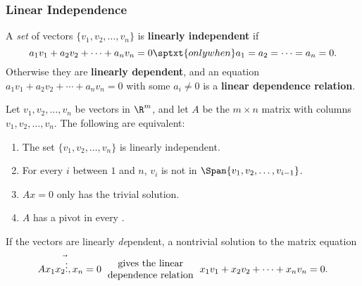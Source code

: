 
\begin{frame}
\frametitle{Linear Independence}

A \emph{set} of vectors $\{v_1,v_2,\ldots,v_n\}$ is
\textbf{linearly independent} if
\[ a_1v_1 + a_2v_2 + \cdots + a_nv_n = 0 
\sptxt{only when} a_1 = a_2 = \cdots = a_n = 0. \]
\pause
Otherwise they are \textbf{linearly dependent}, and an equation
$a_1v_1 + a_2v_2 + \cdots + a_nv_n = 0$
with some $a_i\neq0$ is a \textbf{linear dependence relation}.

\pause
\begin{thm}
  Let $v_1,v_2,\ldots,v_n$ be vectors in $\R^m$, and let $A$ be the
  $m\times n$ matrix with columns $v_1,v_2,\ldots,v_n$.  The following are
  equivalent:
  \begin{enumerate}
    \pause
  \item The set $\{v_1,v_2,\ldots,v_n\}$ is linearly independent.
    \pause
  \item For every $i$ between $1$ and $n$, $v_i$ is not in
    $\Span\{v_1,v_2,\ldots,v_{i-1}\}$.
    \pause
  \item $Ax=0$ only has the trivial solution.
    \pause
  \item $A$ has a pivot in every \pause.
  \end{enumerate}
\end{thm}

\pause
If the vectors are linearly \emph{de}pendent, a nontrivial solution to the
matrix equation
\[ A\vec{x_1 x_2 \vdots, x_n} = 0
\parbox{3.5cm}{\centering gives the linear\\dependence relation}
x_1v_1 + x_2v_2 + \cdots + x_nv_n = 0. \]

\end{frame}



